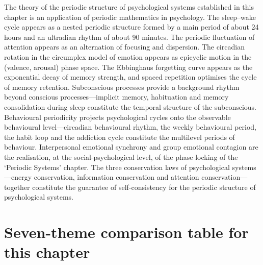 \begin{remark}
The theory of the periodic structure of psychological systems established in this chapter is an application of periodic mathematics in psychology. The sleep--wake cycle appears as a nested periodic structure formed by a main period of about 24 hours and an ultradian rhythm of about 90 minutes. The periodic fluctuation of attention appears as an alternation of focusing and dispersion. The circadian rotation in the circumplex model of emotion appears as epicyclic motion in the (valence, arousal) phase space. The Ebbinghaus forgetting curve appears as the exponential decay of memory strength, and spaced repetition optimises the cycle of memory retention. Subconscious processes provide a background rhythm beyond conscious processes---implicit memory, habituation and memory consolidation during sleep constitute the temporal structure of the subconscious. Behavioural periodicity projects psychological cycles onto the observable behavioural level---circadian behavioural rhythm, the weekly behavioural period, the habit loop and the addiction cycle constitute the multilevel periods of behaviour. Interpersonal emotional synchrony and group emotional contagion are the realisation, at the social-psychological level, of the phase locking of the `Periodic Systems' chapter. The three conservation laws of psychological systems---energy conservation, information conservation and attention conservation---together constitute the guarantee of self-consistency for the periodic structure of psychological systems.
\end{remark}

\section*{Seven-theme comparison table for this chapter}

